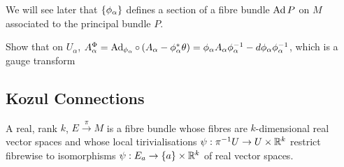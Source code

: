 \documentclass{article}
\begin{document}
\begin{remark}
	We will see later that $\left\{ \phi_\alpha \right\}$ defines a section of a fibre bundle $\operatorname{Ad} P$ on $M$ associated to the principal bundle $P$. 
\end{remark}

\begin{ex}
	Show that on $U_\alpha$, $A_\alpha^\Phi = \operatorname{Ad}_{\phi_\alpha} \circ\left( A_\alpha - \phi_\alpha^\ast \theta \right) = \phi_\alpha A_\alpha \phi_\alpha^{-1} - d\phi_\alpha \phi_\alpha^{-1}$, which is a gauge transform
\end{ex}

\subsection{Kozul Connections}
\begin{definition}
	A real, rank $k$,  $E \overset{\pi}{\to}M$ is a fibre bundle whose fibres are $k$-dimensional real vector spaces and whose local tirivialisations $\psi:\pi^{-1}U \to U \times \mathbb{R}^k$ restrict fibrewise to isomorphisms $\psi : E_a \to \left\{ a \right\} \times \mathbb{R}^k$ of real vector spaces. 
\end{definition}
\end{document}
